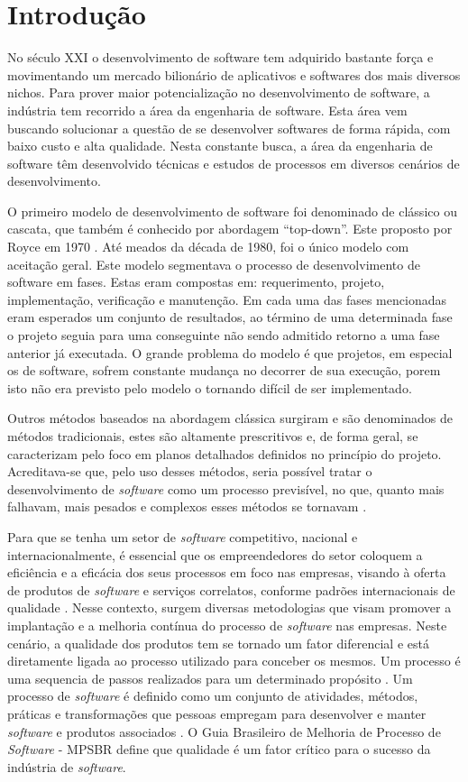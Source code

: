 \documentclass{acm_proc_article-sp}
\begin{document}
\section{Introdução}
No século XXI o desenvolvimento de software tem adquirido bastante força e movimentando um mercado bilionário de aplicativos e softwares dos mais diversos nichos. Para prover maior potencialização no desenvolvimento de software, a indústria tem recorrido a área da engenharia de software. Esta área vem buscando solucionar a questão de se desenvolver softwares de forma rápida, com baixo custo e alta qualidade. Nesta constante busca, a área da engenharia de software têm desenvolvido técnicas e estudos de processos em diversos cenários de desenvolvimento.

O primeiro modelo de desenvolvimento de software foi denominado de clássico ou cascata, que também é conhecido por abordagem “top-down”. Este proposto por Royce em 1970 \cite{Royce}. Até meados da década de 1980, foi o único modelo com aceitação geral. Este modelo segmentava o processo de desenvolvimento de software em fases. Estas eram compostas em: requerimento, projeto, implementação, verificação e manutenção. Em cada uma das fases mencionadas eram esperados um conjunto de resultados, ao término de uma determinada fase o projeto seguia para uma conseguinte não sendo admitido retorno a uma fase anterior já executada. O grande problema do modelo é que projetos, em especial os de software, sofrem constante mudança no decorrer de sua execução, porem isto não era previsto pelo modelo o tornando difícil de ser implementado.

Outros métodos baseados na abordagem clássica surgiram e são denominados de métodos tradicionais, estes são altamente prescritivos e, de forma geral, se caracterizam pelo foco em planos detalhados definidos no princípio do projeto. Acreditava-se que, pelo uso desses métodos, seria possível tratar o desenvolvimento de \textit{software} como um processo previsível, no
que, quanto mais falhavam, mais pesados e complexos esses métodos se tornavam \cite{scrum:agil}.

Para que se tenha um setor de \textit{software} competitivo, nacional e internacionalmente, é essencial que os empreendedores do setor coloquem a eficiência e a eficácia dos seus processos em foco nas empresas,
visando à oferta de produtos de \textit{software} e serviços correlatos, conforme padrões internacionais de qualidade \cite{mpsbr:nAgil}. Nesse contexto, surgem diversas metodologias que visam promover a implantação e a melhoria contínua do processo de \textit{software} nas empresas. Neste cenário, a qualidade dos produtos tem se tornado um fator diferencial e está diretamente ligada ao processo utilizado para conceber os mesmos. Um processo é uma sequencia de passos realizados para um determinado propósito \cite{ieee}. Um processo de \textit{software} é definido como um conjunto de atividades, métodos, práticas e transformações que pessoas empregam para desenvolver e manter \textit{software} e produtos associados \cite{weber}. O Guia Brasileiro de Melhoria de Processo de \textit{Software} - MPSBR define que qualidade é um fator crítico para o sucesso
da indústria de \textit{software}. 
\end{document}
